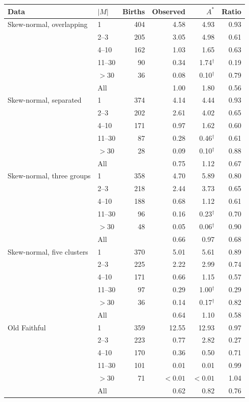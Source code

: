 \begin{tabular}{ll rrrr}
\toprule
Data & $|M|$ & Births & Observed & $A^*$ & Ratio \\
\midrule
Skew-normal, overlapping & 1 & 404 & 4.58 & 4.93 & 0.93 \\
 & 2--3 & 205 & 3.05 & 4.98 & 0.61 \\
 & 4--10 & 162 & 1.03 & 1.65 & 0.63 \\
 & 11--30 & 90 & 0.34 & 1.74$^\dagger$ & 0.19 \\
 & $>30$ & 36 & 0.08 & 0.10$^\dagger$ & 0.79 \\
 & All &  & 1.00 & 1.80 & 0.56 \\
\addlinespace
Skew-normal, separated & 1 & 374 & 4.14 & 4.44 & 0.93 \\
 & 2--3 & 202 & 2.61 & 4.02 & 0.65 \\
 & 4--10 & 171 & 0.97 & 1.62 & 0.60 \\
 & 11--30 & 87 & 0.28 & 0.46$^\dagger$ & 0.61 \\
 & $>30$ & 28 & 0.09 & 0.10$^\dagger$ & 0.88 \\
 & All &  & 0.75 & 1.12 & 0.67 \\
\addlinespace
Skew-normal, three groups & 1 & 358 & 4.70 & 5.89 & 0.80 \\
 & 2--3 & 218 & 2.44 & 3.73 & 0.65 \\
 & 4--10 & 188 & 0.68 & 1.12 & 0.61 \\
 & 11--30 & 96 & 0.16 & 0.23$^\dagger$ & 0.70 \\
 & $>30$ & 48 & 0.05 & 0.06$^\dagger$ & 0.90 \\
 & All &  & 0.66 & 0.97 & 0.68 \\
\addlinespace
Skew-normal, five clusters & 1 & 370 & 5.01 & 5.61 & 0.89 \\
 & 2--3 & 225 & 2.22 & 2.99 & 0.74 \\
 & 4--10 & 171 & 0.66 & 1.15 & 0.57 \\
 & 11--30 & 97 & 0.29 & 1.00$^\dagger$ & 0.29 \\
 & $>30$ & 36 & 0.14 & 0.17$^\dagger$ & 0.82 \\
 & All &  & 0.64 & 1.10 & 0.58 \\
\addlinespace
Old Faithful & 1 & 359 & 12.55 & 12.93 & 0.97 \\
 & 2--3 & 223 & 0.77 & 2.82 & 0.27 \\
 & 4--10 & 170 & 0.36 & 0.50 & 0.71 \\
 & 11--30 & 101 & 0.01 & 0.01 & 0.99 \\
 & $>30$ & 71 & $<0.01$ & $<0.01$ & 1.04 \\
 & All &  & 0.62 & 0.82 & 0.76 \\
\bottomrule
\end{tabular}
